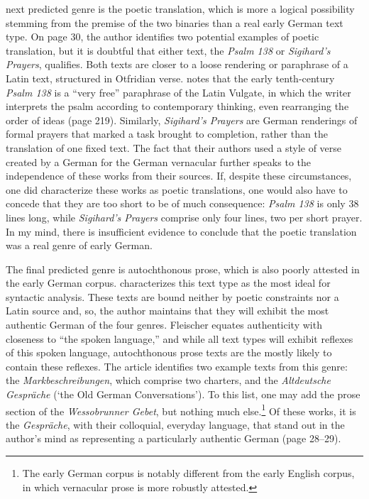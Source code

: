  next predicted genre is the poetic translation, which is more a logical possibility stemming from the premise of the two binaries than a real early German text type. On page 30, the author identifies two potential examples of poetic translation, but it is doubtful that either text, the \textit{Psalm 138} or \textit{Sigihard’s Prayers}, qualifies. Both texts are closer to a loose rendering or paraphrase of a Latin text, structured in Otfridian verse. \citet[218--220]{Bostock1976} notes that the early tenth-century \textit{Psalm 138} is a “very free” paraphrase of the Latin Vulgate, in which the writer interprets the psalm according to contemporary thinking, even rearranging the order of ideas (page 219). Similarly, \textit{Sigihard’s Prayers} are German renderings of formal prayers that marked a task brought to completion, rather than the translation of one fixed text. The fact that their authors used a style of verse created by a German for the German vernacular further speaks to the independence of these works from their sources. If, despite these circumstances, one did characterize these works as poetic translations, one would also have to concede that they are too short to be of much consequence: \textit{Psalm 138} is only 38 lines long, while \textit{Sigihard’s Prayers} comprise only four lines, two per short prayer. In my mind, there is insufficient evidence to conclude that the poetic translation was a real genre of early German.

The final predicted genre is autochthonous prose, which is also poorly attested in the early German corpus. \citet[28]{Fleischer2006} characterizes this text type as the most ideal for syntactic analysis. These texts are bound neither by poetic constraints nor a Latin source and, so, the author maintains that they will exhibit the most authentic German of the four genres. Fleischer equates authenticity with closeness to “the spoken language,” and while all text types will exhibit reflexes of this spoken language, autochthonous prose texts are the mostly likely to contain these reflexes. The article identifies two example texts from this genre: the \textit{Markbeschreibungen}, which comprise two charters, and the \textit{Altdeutsche Gespräche} (‘the Old German Conversations’). To this list, one may add the prose section of the \textit{Wessobrunner Gebet}, but nothing much else.\footnote{{The early German corpus is notably different from the early English corpus, in which vernacular prose is more robustly attested.} } Of these works, it is the \textit{Gespräche}, with their colloquial, everyday language, that stand out in the author’s mind as representing a particularly authentic German (page 28--29).

